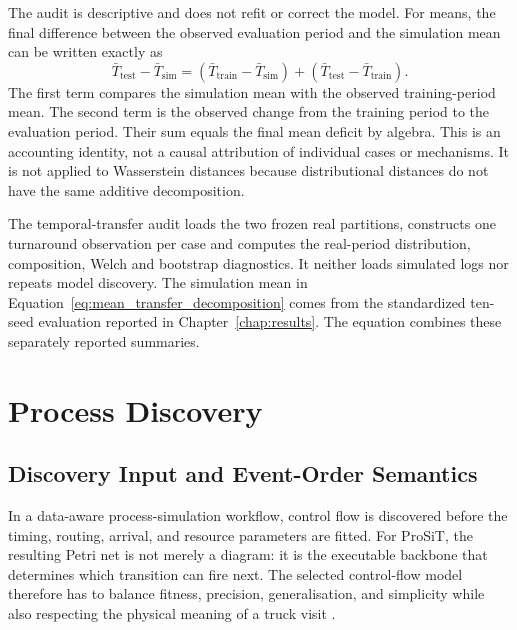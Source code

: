 The audit is descriptive and does not refit or correct the model. For means,
the final difference between the observed evaluation period and the simulation
mean can be written exactly as
\begin{equation}
\bar{T}_{\mathrm{test}}-\bar{T}_{\mathrm{sim}}
=
(\bar{T}_{\mathrm{train}}-\bar{T}_{\mathrm{sim}})
+(\bar{T}_{\mathrm{test}}-\bar{T}_{\mathrm{train}}).
\label{eq:mean_transfer_decomposition}
\end{equation}
The first term compares the simulation mean with the observed training-period
mean. The second term is the observed change from the training period to the
evaluation period. Their sum equals the final mean deficit by algebra. This is
an accounting identity, not a causal attribution of individual cases or
mechanisms. It is not applied to Wasserstein distances because distributional
distances do not have the same additive decomposition.

The temporal-transfer audit loads the two frozen real partitions, constructs
one turnaround observation per case and computes the real-period distribution,
composition, Welch and bootstrap diagnostics. It neither loads simulated logs
nor repeats model discovery. The
simulation mean in Equation~\ref{eq:mean_transfer_decomposition} comes from the
standardized ten-seed evaluation reported in Chapter~\ref{chap:results}. The
equation combines these separately reported summaries.

\section{Process Discovery}
\label{sec:process_discovery_methodology}

\subsection{Discovery Input and Event-Order Semantics}

In a data-aware process-simulation workflow, control flow is discovered before
the timing, routing, arrival, and resource parameters are fitted. For ProSiT,
the resulting Petri net is not merely a diagram: it is the executable backbone
that determines which transition can fire next. The selected control-flow model therefore
has to balance fitness, precision, generalisation, and simplicity while also
respecting the physical meaning of a truck visit
\cite{Leemans2014InductiveMiner,PMvanDerAalst2016}.

